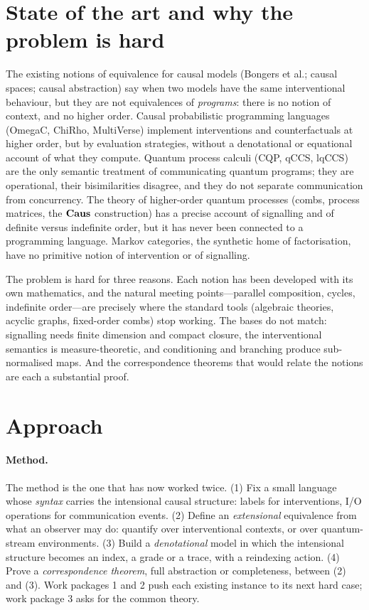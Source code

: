 \section{State of the art and why the problem is hard}

The existing notions of equivalence for causal models (Bongers et al.; causal spaces; causal abstraction) say when two models have the same interventional behaviour, but they are not equivalences of \emph{programs}: there is no notion of context, and no higher order. Causal probabilistic programming languages (OmegaC, ChiRho, MultiVerse) implement interventions and counterfactuals at higher order, but by evaluation strategies, without a denotational or equational account of what they compute. Quantum process calculi (CQP, qCCS, lqCCS) are the only semantic treatment of communicating quantum programs; they are operational, their bisimilarities disagree, and they do not separate communication from concurrency. The theory of higher-order quantum processes (combs, process matrices, the $\mathbf{Caus}$ construction) has a precise account of signalling and of definite versus indefinite order, but it has never been connected to a programming language. Markov categories, the synthetic home of factorisation, have no primitive notion of intervention or of signalling.

The problem is hard for three reasons. Each notion has been developed with its own mathematics, and the natural meeting points---parallel composition, cycles, indefinite order---are precisely where the standard tools (algebraic theories, acyclic graphs, fixed-order combs) stop working. The bases do not match: signalling needs finite dimension and compact closure, the interventional semantics is measure-theoretic, and conditioning and branching produce sub-normalised maps. And the correspondence theorems that would relate the notions are each a substantial proof.

\section{Approach}\label{sec:approach}

\paragraph{Method.} The method is the one that has now worked twice. (1) Fix a small language whose \emph{syntax} carries the intensional causal structure: labels for interventions, I/O operations for communication events. (2) Define an \emph{extensional} equivalence from what an observer may do: quantify over interventional contexts, or over quantum-stream environments. (3) Build a \emph{denotational} model in which the intensional structure becomes an index, a grade or a trace, with a reindexing action. (4) Prove a \emph{correspondence theorem}, full abstraction or completeness, between (2) and (3). Work packages 1 and 2 push each existing instance to its next hard case; work package 3 asks for the common theory.

